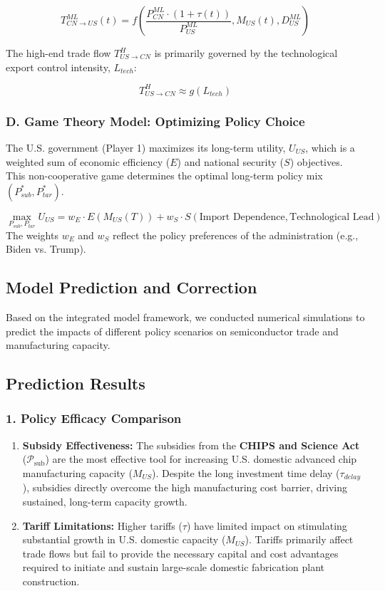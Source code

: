 \documentclass[12pt]{article}
\begin{document}
\[
T_{CN \to US}^{ML}(t) = f\left(\frac{P_{CN}^{ML} \cdot (1+\tau(t))}{P_{US}^{ML}} , M_{US}(t), D_{US}^{ML}\right)
\]

The high-end trade flow $T_{US \to CN}^{H}$ is primarily governed by the technological export control intensity, $L_{tech}$:

\[
T_{US \to CN}^H \approx g(L_{tech})
\]

\subsubsection{D. Game Theory Model: Optimizing Policy Choice}
The U.S. government (Player 1) maximizes its long-term utility, $U_{US}$, which is a weighted sum of economic efficiency ($E$) and national security ($S$) objectives. This non-cooperative game determines the optimal long-term policy mix $\left(P_{sub}^*, P_{tar}^*\right)$.

\[
\max_{P_{sub}, P_{tar}} U_{US} = w_{E} \cdot E(M_{US}(T)) + w_{S} \cdot S(\text{Import Dependence}, \text{Technological Lead})
\]
The weights $w_E$ and $w_S$ reflect the policy preferences of the administration (e.g., Biden vs. Trump).

\subsection{Model Prediction and Correction}
Based on the integrated model framework, we conducted numerical simulations to predict the impacts of different policy scenarios on semiconductor trade and manufacturing capacity.

\subsection{Prediction Results}

\subsubsection{1. Policy Efficacy Comparison}
\begin{enumerate}
    \item \textbf{Subsidy Effectiveness:} The subsidies from the \textbf{CHIPS and Science Act} ($\mathcal{P}_{\text{sub}}$) are the most effective tool for increasing U.S. domestic advanced chip manufacturing capacity ($M_{US}$). Despite the long investment time delay ($\tau_{delay}$), subsidies directly overcome the high manufacturing cost barrier, driving sustained, long-term capacity growth.
    \item \textbf{Tariff Limitations:} Higher tariffs ($\tau$) have limited impact on stimulating substantial growth in U.S. domestic capacity ($M_{US}$). Tariffs primarily affect trade flows but fail to provide the necessary capital and cost advantages required to initiate and sustain large-scale domestic fabrication plant construction.
\end{enumerate}
\end{document}

